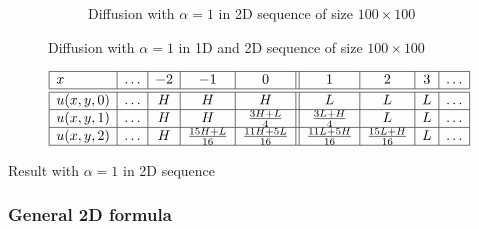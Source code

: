\begin{figure}[h]
\begin{subfigure}[b]{0.49\textwidth}
        \caption{Diffusion with $\alpha = 1$ in 2D sequence of size $100 \times 100$}
        \label{fig:diff_2d_100}
    \end{subfigure}
    \caption{Diffusion with $\alpha = 1$ in 1D and 2D sequence of size $100 \times 100$}
    \label{fig:diff_1d_vs_2d_100}
\end{figure}

\begin{table}[h]
    \centering
    $$
        \begin{array}{|l|c|c|c|c||c|c|c|c|} \hline
        x       &\ldots&-2&       -1       &        0        &        1        &        2       &3&\ldots\\\hline \hline
        u(x,y,0)&\ldots& H&        H       &        H        &        L        &        L       &L&\ldots\\\hline
        u(x,y,1)&\ldots& H&        H       & \frac{3H+L}{4}  & \frac{3L+H}{4}  &        L       &L&\ldots\\\hline
        u(x,y,2)&\ldots& H&\frac{15H+L}{16}&\frac{11H+5L}{16}&\frac{11L+5H}{16}&\frac{15L+H}{16}&L&\ldots\\\hline
        \end{array}
    $$
    \caption{Result with $\alpha=1$ in 2D sequence}
    \label{tab:result_2d_1a}
\end{table}

\subsubsection{General 2D formula}

